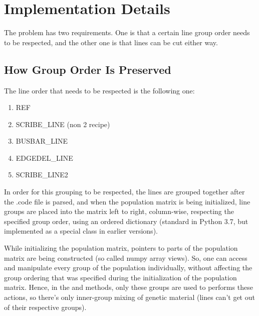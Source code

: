 \documentclass[letterpaper,10pt,english,openany,oneside]{sphinxmanual}
\begin{document}
\chapter{Implementation Details}
\label{\detokenize{implementation_details:implementation-details}}\label{\detokenize{implementation_details::doc}}
The problem has two requirements. One is that a certain line group order needs
to be respected, and the other one is that lines can be cut either way.


\section{How Group Order Is Preserved}
\label{\detokenize{implementation_details:how-group-order-is-preserved}}
The line order that needs to be respected is the following one:
\begin{enumerate}
\def\theenumi{\arabic{enumi}}
\def\labelenumi{\theenumi .}
\makeatletter\def\p@enumii{\p@enumi \theenumi .}\makeatother
\item {} 
REF

\item {} 
SCRIBE\_LINE (non 2 recipe)

\item {} 
BUSBAR\_LINE

\item {} 
EDGEDEL\_LINE

\item {} 
SCRIBE\_LINE2

\end{enumerate}

In order for this grouping to be respected, the lines are grouped together
after the .code file is parsed, and when the population matrix is being
initialized, line groups are placed into the matrix left to right, column-wise,
respecting the specified group order, using an ordered dictionary (standard in
Python 3.7, but implemented as a special  class in earlier
versions).

While initializing the population matrix, pointers to parts of the population
matrix are being constructed (so called numpy array views). So, one can access
and manipulate every group of the population individually, without affecting
the group ordering that was specified during the initialization of the
population matrix. Hence, in the  and  methods, only these
groups are used to performs these actions, so there’s only inner-group mixing
of genetic material (lines can’t get out of their respective groups).
\end{document}
